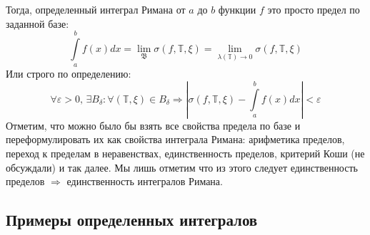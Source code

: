 \documentclass[12pt]{article}
\newcommand{\MTB}{\mathbb{T}}
\newcommand{\VE}{\varepsilon}
\theoremstyle{definition}
\newcommand{\ddint}[2]{\displaystyle\int\limits_{#1}^{#2}}
\begin{document}
Тогда, определенный интеграл Римана от $a$ до $b$ функции $f$ это просто предел по заданной базе:
$$
	\ddint{a}{b}f(x)dx = \lim\limits_{\mathfrak{B}}\sigma(f, \MTB, \xi) = \lim\limits_{\lambda(\MTB) \to 0}\sigma(f, \MTB, \xi)
$$
Или строго по определению:
$$
	\forall \VE > 0, \, \exists B_\delta \colon \forall (\MTB, \xi) \in B_\delta \Rightarrow \left|\sigma(f, \MTB, \xi) - \ddint{a}{b}f(x)dx\right| < \VE
$$
Отметим, что можно было бы взять все свойства предела по базе и переформулировать их как свойства интеграла Римана: арифметика пределов, переход к пределам в неравенствах, единственность пределов, критерий Коши (не обсуждали) и так далее. Мы лишь отметим что из этого следует единственность пределов $\Rightarrow$ единственность интегралов Римана.

\subsection*{Примеры определенных интегралов}
\end{document}
